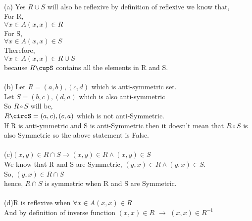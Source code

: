 \documentclass[addpoints]{exam}
\begin{document}
\begin{questions}


  \begin{solution}\\
    (a) Yes $R \cup S$ will also be reflexive by definition of reflexive we know that,\\
    For R,\\
    $\forall x \in A {(x,x) \in R}$\\
    For S,\\
    $\forall x \in A {(x,x) \in S}$\\
    Therefore,\\
    $\forall x \in A {(x,x) \in R \cup S}$\\
    because $R\cupS$ contains all the elements in R and S.\\
    \\
    (b) Let $R = {(a,b),(c,d)}$ which is anti-symmetric set.\\
    Let $S = {(b,c),(d,a)}$ which is also anti-symmetric\\
    So $R \circ S$ will be,\\
    $R\circS = {(a,c),(c,a)}$ which is not anti-Symmetric.\\
    If R is anti-ymmetric and S is anti-Symmetric then it doesn't mean that $R \circ S$ is also Symmetric so the above statement is False.\\  
    \\
    (c)$(x,y) \in R \cap S \rightarrow (x,y) \in R \wedge (x,y) \in S$\\
    We know that R and S are Symmetric, $(y,x) \in R \wedge (y,x) \in S.$\\
    So, $(y,x) \in R \cap S$\\
    hence, $R \cap S $ is symmetric when R and S are Symmetric.\\
    \\
    (d)R is reflexive when $\forall x \in A {(x,x) \in R}$\\
    And by definition of inverse function ${(x,x) \in R}$ $\rightarrow$ ${(x,x) \in R^{-1}}$\\

\end{solution}
\end{questions}
\end{document}
